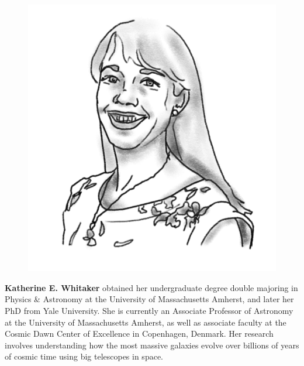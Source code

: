 \begin{figure}
\includegraphics[width=0.9\linewidth]{portraits/katherine.png}
\end{figure}
\textbf{Katherine E. Whitaker} obtained her undergraduate degree double majoring in Physics \& Astronomy at the University of Massachusetts Amherst, and later her PhD from Yale University. She is currently an Associate Professor of Astronomy at the University of Massachusetts Amherst, as well as associate faculty at the Cosmic Dawn Center of Excellence in Copenhagen, Denmark. Her research involves understanding how the most massive galaxies evolve over billions of years of cosmic time using big telescopes in space.\\
\\

